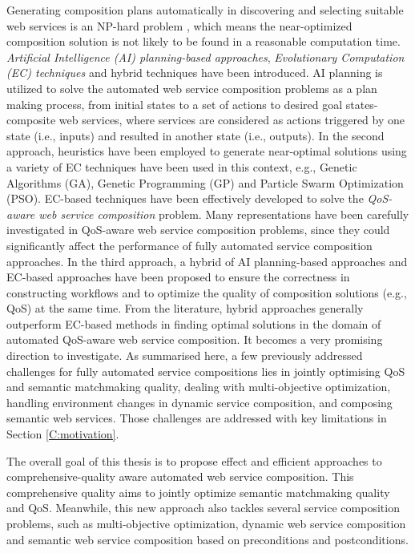 Generating composition plans automatically in discovering and selecting suitable web services is an NP-hard problem \cite{moghaddam2014service}, which means the near-optimized composition solution is not likely to be found in a reasonable computation time. \emph{Artificial Intelligence (AI) planning-based approaches}, \emph{Evolutionary Computation (EC) techniques} and hybrid techniques have been introduced. AI planning is utilized to solve the automated web service composition problems as a plan making process, from initial states to a set of actions to desired goal states-composite web services, where services are considered as actions triggered by one state (i.e., inputs) and resulted in another state (i.e., outputs). In the second approach, heuristics have been employed to generate near-optimal solutions using a variety of EC techniques have been used in this context, e.g., Genetic Algorithms (GA), Genetic Programming (GP) and Particle Swarm Optimization (PSO). EC-based techniques have been effectively developed to solve the \emph{QoS-aware web service composition} problem. Many representations have been carefully investigated in QoS-aware web service composition problems, since they could significantly affect the performance of fully automated service composition approaches. In the third approach, a hybrid of AI planning-based approaches and EC-based approaches \cite{da2016genetic,ma2015hybrid} have been proposed to ensure the correctness in constructing workflows and to optimize the quality of composition solutions (e.g., QoS) at the same time. From the literature, hybrid approaches generally outperform EC-based methods in finding optimal solutions in the domain of automated QoS-aware web service composition. It becomes a very promising direction to investigate. As summarised here, a few previously addressed challenges for fully automated service compositions lies in jointly optimising QoS and semantic matchmaking quality, dealing with multi-objective optimization, handling environment changes in dynamic service composition, and composing semantic web services. Those challenges are addressed with key limitations in Section \ref{C:motivation}. 

The overall goal of this thesis is to propose effect and efficient approaches to comprehensive-quality aware automated web service composition. This comprehensive quality aims to jointly optimize semantic matchmaking quality and QoS. Meanwhile, this new approach also tackles several service composition problems, such as multi-objective optimization, dynamic web service composition and semantic web service composition based on preconditions and postconditions.

